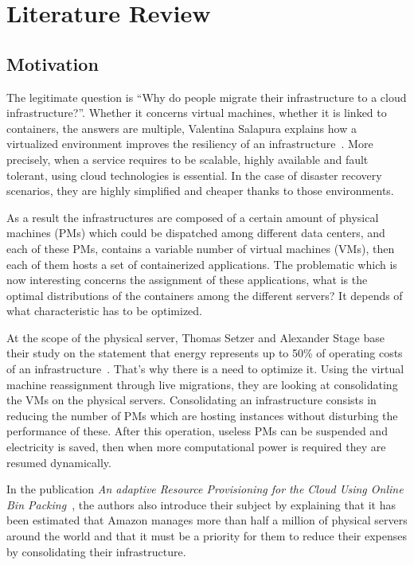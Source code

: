 \chapter{Literature Review}
\label{litreview}

\section{Motivation}

The legitimate question is “Why do people migrate their infrastructure to a
cloud infrastructure?”. Whether it concerns virtual machines, whether it is linked
to containers, the answers are multiple, Valentina Salapura explains
how a virtualized environment improves the resiliency of an
infrastructure~\citep*{virtresiliency}. More precisely, when a service requires
to be scalable, highly available and fault tolerant, using cloud technologies
is essential. In the case of disaster recovery scenarios, they are highly
simplified and cheaper thanks to those environments.

As a result the infrastructures are composed of a certain amount of physical
machines (PMs) which could be dispatched among different data centers, and each
of these PMs, contains a variable number of virtual machines (VMs), then each
of them hosts a set of containerized applications. The problematic which is now
interesting concerns the assignment of these applications, what is the optimal
distributions of the containers among the different servers? It depends of what
characteristic has to be optimized.

At the scope of the physical server, Thomas Setzer and Alexander Stage base
their study on the statement that energy represents up to 50\% of operating
costs of an infrastructure~\citep*{reassignmentElectricitysaving}. That's why
there is a need to optimize it. Using the virtual machine reassignment through
live migrations, they are looking at consolidating the VMs on the physical
servers.  Consolidating an infrastructure consists in reducing the number of
PMs which are hosting instances without disturbing the performance of these.
After this operation, useless PMs can be suspended and electricity is saved,
then when more computational power is required they are resumed dynamically.

In the publication \textit{An adaptive Resource Provisioning for the Cloud
Using Online Bin Packing}~\citep*{reassignmentBinpacking1}, the authors also
introduce their subject by explaining that it has been estimated that Amazon
manages more than half a million of physical servers around the world and that
it must be a priority for them to reduce their expenses by consolidating
their infrastructure.

